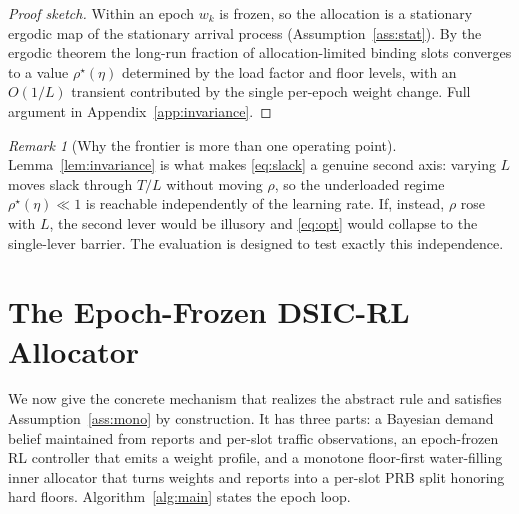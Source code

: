 \documentclass[conference]{IEEEtran}
\theoremstyle{definition}
\theoremstyle{remark}
\newtheorem{remark}{Remark}
\newcommand{\Slots}{T}
\newcommand{\Ep}{L}
\newcommand{\rhobind}{\rho}
\newcommand{\load}{\eta}
\newcommand{\wt}{w}
\begin{document}
\begin{proof}[Proof sketch]
Within an epoch $\wt_k$ is frozen, so the allocation is a stationary ergodic map of the stationary arrival process (Assumption~\ref{ass:stat}). By the ergodic theorem the long-run fraction of allocation-limited binding slots converges to a value $\rhobind^\star(\load)$ determined by the load factor and floor levels, with an $O(1/\Ep)$ transient contributed by the single per-epoch weight change. Full argument in Appendix~\ref{app:invariance}.
\end{proof}

\begin{remark}[Why the frontier is more than one operating point]
Lemma~\ref{lem:invariance} is what makes \eqref{eq:slack} a genuine second axis: varying $\Ep$ moves slack through $\Slots/\Ep$ without moving $\rhobind$, so the underloaded regime $\rhobind^\star(\load)\ll1$ is reachable independently of the learning rate. If, instead, $\rhobind$ rose with $\Ep$, the second lever would be illusory and \eqref{eq:opt} would collapse to the single-lever barrier. The evaluation is designed to test exactly this independence.
\end{remark}

\section{The Epoch-Frozen DSIC-RL Allocator}\label{sec:algo}
We now give the concrete mechanism that realizes the abstract rule and satisfies Assumption~\ref{ass:mono} by construction. It has three parts: a Bayesian demand belief maintained from reports and per-slot traffic observations, an epoch-frozen RL controller that emits a weight profile, and a monotone floor-first water-filling inner allocator that turns weights and reports into a per-slot PRB split honoring hard floors. Algorithm~\ref{alg:main} states the epoch loop.
\end{document}
